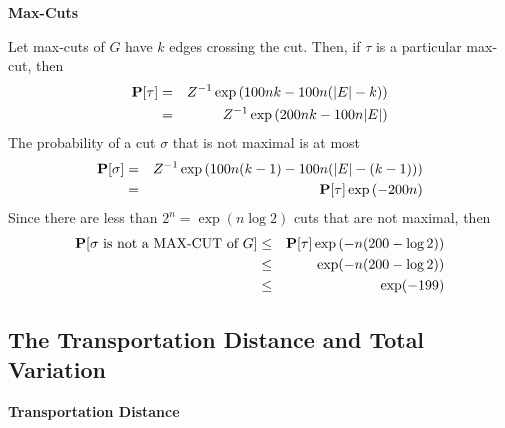 \documentclass[11pt]{article} \usepackage{amssymb}
\begin{document}
{\bf Max-Cuts}

Let max-cuts of $G$ have $k$ edges crossing the cut. Then, if $\tau$ is a particular
max-cut, then
\begin{eqnarray*}
  \P[\tau]&=&Z^{-1}\exp\left(100nk-100n(|E|-k)\right)
  \\ &=& Z^{-1}\exp\left(200nk-100n|E|\right)
\end{eqnarray*}
The probability of a cut $\sigma$ that is not maximal is at most
\begin{eqnarray*}
  \P[\sigma]&=&Z^{-1}\exp\left(100n(k-1)-100n(|E|-(k-1))\right)
  \\ &=& \P[\tau]\exp\left(-200n\right)
\end{eqnarray*}
Since there are less than $2^n=\exp(n\log 2)$ cuts that are not maximal, then
\begin{eqnarray*}
  \P[\sigma\mbox{ is not a MAX-CUT of $G$}] &\leq& \P[\tau]\exp\left(-n(200-\log 2)\right)
\\ &\leq& \exp(-n(200-\log 2)) 
\\ &\leq& \exp(-199) 
\end{eqnarray*}

\subsection{The Transportation Distance and Total Variation}
{\bf Transportation Distance}
\end{document}
